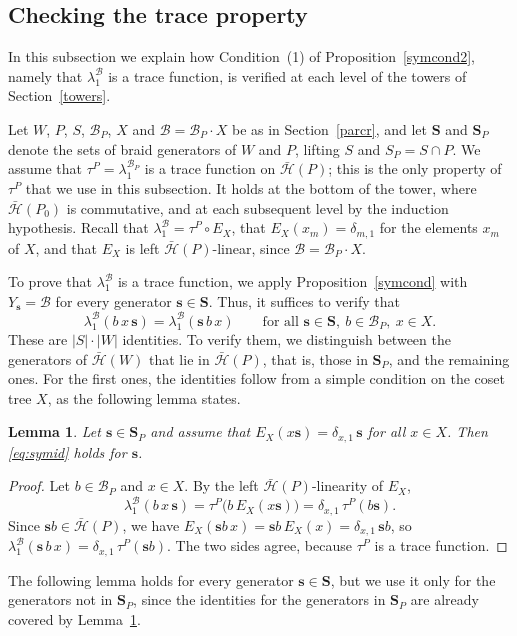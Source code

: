 \documentclass[11pt, reqno]{amsart}
\newcommand{\cB}{\mathcal{B}}
\newcommand{\cH}{\mathcal{H}}
\numberwithin{equation}{section}
\newtheorem{lemma}[theorem]{Lemma}
\theoremstyle{remark}
\begin{document}
\subsection{Checking the trace property}\label{subsec:symmetry}
In this subsection we explain how Condition~(1) of Proposition~\ref{symcond2}, namely that $\lambda_1^{\cB}$ is a trace function, is verified at each level of the towers of Section~\ref{towers}.

Let $W$, $P$, $S$, $\cB_P$, $X$ and $\cB=\cB_P\cdot X$ be as in Section~\ref{parcr}, and let $\mathbf S$ and $\mathbf S_P$ denote the sets of braid generators of $W$ and $P$, lifting $S$ and $S_P=S\cap P$. We assume that $\tau^P=\lambda_1^{\cB_P}$ is a trace function on $\bar{\cH}(P)$; this is the only property of $\tau^P$ that we use in this subsection. It holds at the bottom of the tower, where $\bar{\cH}(P_0)$ is commutative, and at each subsequent level by the induction hypothesis. Recall that $\lambda_1^{\cB}=\tau^P\circ E_X$, that $E_X(x_m)=\delta_{m,1}$ for the elements $x_m$ of $X$, and that $E_X$ is left $\bar{\cH}(P)$-linear, since $\cB=\cB_P\cdot X$.

To prove that $\lambda_1^{\cB}$ is a trace function, we apply Proposition~\ref{symcond} with $Y_{\mathbf s}=\cB$ for every generator $\mathbf s\in\mathbf S$. Thus, it suffices to verify that
\begin{equation}\label{eq:symid}
	\lambda_1^{\cB}(b\,x\,\mathbf s)=\lambda_1^{\cB}(\mathbf s\,b\,x)\qquad\text{for all }\mathbf s\in\mathbf S,\ b\in\cB_P,\ x\in X.
\end{equation}
These are $|S|\cdot|W|$ identities. To verify them, we distinguish between the generators of $\bar{\cH}(W)$ that lie in $\bar{\cH}(P)$, that is, those in $\mathbf S_P$, and the remaining ones. For the first ones, the identities follow from a simple condition on the coset tree $X$, as the following lemma states.

\begin{lemma}\label{lem:genP}
	Let $\mathbf s\in\mathbf S_P$ and assume that $E_X(x\mathbf s)=\delta_{x,1}\,\mathbf s$ for all $x\in X$. Then \eqref{eq:symid} holds for $\mathbf s$.
\end{lemma}
\begin{proof}
Let $b\in\cB_P$ and $x\in X$. By the left $\bar{\cH}(P)$-linearity of $E_X$,
\[
\lambda_1^{\cB}(b\,x\,\mathbf s)=\tau^P\bigl(b\,E_X(x\mathbf s)\bigr)=\delta_{x,1}\,\tau^P(b\mathbf s).
\]
Since $\mathbf s b\in\bar{\cH}(P)$, we have $E_X(\mathbf s b\,x)=\mathbf s b\,E_X(x)=\delta_{x,1}\,\mathbf s b$, so $\lambda_1^{\cB}(\mathbf s\,b\,x)=\delta_{x,1}\,\tau^P(\mathbf s b)$. The two sides agree, because $\tau^P$ is a trace function.
\end{proof}
The following lemma holds for every generator $\mathbf s\in\mathbf S$, but we use it only for the generators not in $\mathbf S_P$, since the identities for the generators in $\mathbf S_P$ are already covered by Lemma~\ref{lem:genP}.
\end{document}
